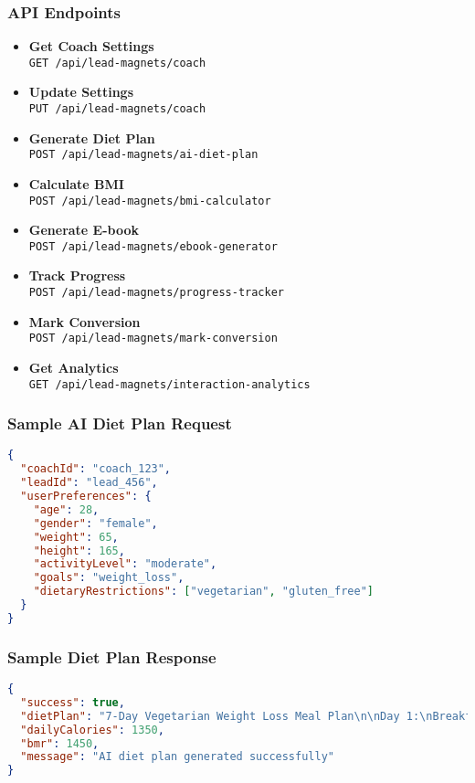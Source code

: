 \documentclass[12pt,a4paper]{article}
\newcommand{\apiendpoint}[2]{\textbf{#1} \\ \texttt{#2}}
\newcommand{\samplecode}[1]{\begin{lstlisting}[language=JSON]#1\end{lstlisting}}
\begin{document}
\subsubsection{API Endpoints}
\begin{itemize}
    \item \apiendpoint{Get Coach Settings}{GET /api/lead-magnets/coach}
    \item \apiendpoint{Update Settings}{PUT /api/lead-magnets/coach}
    \item \apiendpoint{Generate Diet Plan}{POST /api/lead-magnets/ai-diet-plan}
    \item \apiendpoint{Calculate BMI}{POST /api/lead-magnets/bmi-calculator}
    \item \apiendpoint{Generate E-book}{POST /api/lead-magnets/ebook-generator}
    \item \apiendpoint{Track Progress}{POST /api/lead-magnets/progress-tracker}
    \item \apiendpoint{Mark Conversion}{POST /api/lead-magnets/mark-conversion}
    \item \apiendpoint{Get Analytics}{GET /api/lead-magnets/interaction-analytics}
\end{itemize}

\subsubsection{Sample AI Diet Plan Request}
\samplecode{
{
  "coachId": "coach_123",
  "leadId": "lead_456",
  "userPreferences": {
    "age": 28,
    "gender": "female",
    "weight": 65,
    "height": 165,
    "activityLevel": "moderate",
    "goals": "weight_loss",
    "dietaryRestrictions": ["vegetarian", "gluten_free"]
  }
}
}

\subsubsection{Sample Diet Plan Response}
\samplecode{
{
  "success": true,
  "dietPlan": "7-Day Vegetarian Weight Loss Meal Plan\n\nDay 1:\nBreakfast: Oatmeal with berries and nuts (350 cal)\nLunch: Quinoa salad with vegetables (400 cal)\nDinner: Lentil soup with whole grain bread (450 cal)\nSnacks: Greek yogurt with honey (150 cal)\n\nTotal Daily Calories: 1350\nMacros: Protein 65g, Carbs 180g, Fat 45g\n\nShopping List:\n- Oats, berries, mixed nuts\n- Quinoa, mixed vegetables\n- Lentils, whole grain bread\n- Greek yogurt, honey\n\nPreparation Tips:\n- Cook quinoa in advance for the week\n- Prepare overnight oats for quick breakfasts\n- Batch cook lentil soup for multiple meals",
  "dailyCalories": 1350,
  "bmr": 1450,
  "message": "AI diet plan generated successfully"
}
}
\end{document}
